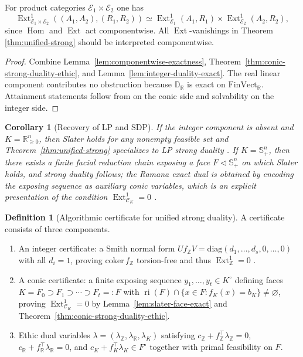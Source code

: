 \documentclass[12pt]{article}
\newcommand{\E}{\mathcal{E}}
\newcommand{\Hom}{\operatorname{Hom}}
\newcommand{\Ext}{\operatorname{Ext}}
\theoremstyle{plain}
\newtheorem{corollary}[theorem]{Corollary}
\theoremstyle{definition}
\newtheorem{definition}[theorem]{Definition}
\theoremstyle{remark}
\numberwithin{equation}{section}
\begin{document}
For product categories $\E_1\times\E_2$ one has
\[
\Ext^1_{\E_1\times\E_2}
((A_1,A_2),(R_1,R_2))
\simeq
\Ext^1_{\E_1}(A_1,R_1)
\times
\Ext^1_{\E_2}(A_2,R_2),
\]
since $\Hom$ and $\Ext$ act componentwise.
All $\Ext$-vanishings in Theorem \ref{thm:unified-strong}
should be interpreted componentwise.

\begin{proof}
Combine Lemma~\ref{lem:componentwise-exactness}, Theorem~\ref{thm:conic-strong-duality-ethic}, and Lemma~\ref{lem:integer-duality-exact}. The real linear component contributes no obstruction because $\mathbb D_{\mathbb R}$ is exact on $\mathrm{FinVect}_{\mathbb R}$. Attainment statements follow from \cite{Rockafellar1970} on the conic side and solvability on the integer side.
\end{proof}

\begin{corollary}[Recovery of LP and SDP]\label{cor:lp-sdp-recovery}
If the integer component is absent and $K=\mathbb R^n_{\ge 0}$, then Slater holds for any nonempty feasible set and Theorem~\ref{thm:unified-strong} specializes to LP strong duality \cite{Rockafellar1970}. If $K=\mathbb S_+^n$, then there exists a finite facial reduction chain exposing a face $F\triangleleft \mathbb S_+^n$ on which Slater holds, and strong duality follows; the Ramana exact dual is obtained by encoding the exposing sequence as auxiliary conic variables, which is an explicit presentation of the condition $\Ext^1_{\mathcal C_K}=0$ \cite{BorweinWolkowicz1981,Pataki1998,Pataki2013,Ramana1997}.
\end{corollary}

\begin{definition}[Algorithmic certificate for unified strong duality]
A certificate consists of three components.
\begin{enumerate}[label=(\roman*)]
\item An integer certificate: a Smith normal form $U f_{\mathbb Z} V=\mathrm{diag}(d_1,\dots,d_s,0,\dots,0)$ with all $d_i=1$, proving $\mathrm{coker}\,f_{\mathbb Z}$ torsion-free and thus $\Ext^1_{\mathbb Z}=0$ \cite{Schrijver1986}.
\item A conic certificate: a finite exposing sequence $y_1,\dots,y_t\in K^\circ$ defining faces $K=F_0\supset F_1\supset\cdots\supset F_t=:F$ with $\operatorname{ri}(F)\cap\{x\in F: f_K(x)=b_K\}\neq\varnothing$, proving $\Ext^1_{\mathcal C_K}=0$ by Lemma~\ref{lem:slater-face-exact} and Theorem~\ref{thm:conic-strong-duality-ethic}.
\item Ethic dual variables $\lambda=(\lambda_{\mathbb Z},\lambda_{\mathbb R},\lambda_K)$ satisfying $c_{\mathbb Z}+ f_{\mathbb Z}^\top\lambda_{\mathbb Z}=0$, $c_{\mathbb R}+ f_{\mathbb R}^\top\lambda_{\mathbb R}=0$, and $c_K+ f_K^\top\lambda_K\in F^\circ$ together with primal feasibility on $F$.
\end{enumerate}
\end{definition}
\end{document}
